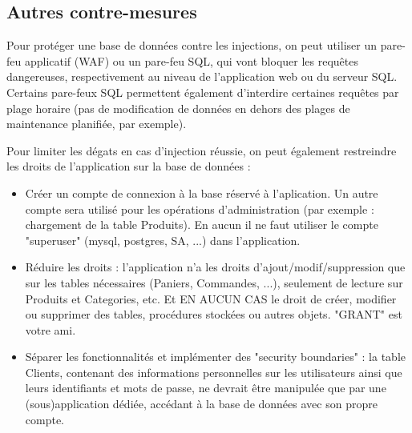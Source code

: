 \subsection{Autres contre-mesures}\label{vulnerabilites:web:sqli:countermeasures:others}

Pour protéger une base de données contre les injections, on peut utiliser un pare-feu applicatif (WAF) ou un pare-feu SQL, qui vont bloquer les requêtes dangereuses, respectivement au niveau de l'application web ou du serveur SQL. Certains pare-feux SQL permettent également d'interdire certaines requêtes par plage horaire (pas de modification de données en dehors des plages de maintenance planifiée, par exemple).

\begin{tabbing}
\end{tabbing}
Pour limiter les dégats en cas d'injection réussie, on peut également restreindre les droits de l'application sur la base de données :
\begin{tabbing}
\end{tabbing}
\begin{itemize}
\item Créer un compte de connexion à la base réservé à l'aplication. Un autre compte sera utilisé pour les opérations d'administration (par exemple : chargement de la table Produits). En aucun il ne faut utiliser le compte "superuser" (mysql, postgres, SA, ...) dans l'application.
\item Réduire les droits : l'application n'a les droits d'ajout/modif/suppression que sur les tables nécessaires (Paniers, Commandes, ...), seulement de lecture sur Produits et Categories, etc. Et EN AUCUN CAS le droit de créer, modifier ou supprimer des tables, procédures stockées ou autres objets. "GRANT" est votre ami.
\item Séparer les fonctionnalités et implémenter des "security boundaries" : la table Clients, contenant des informations personnelles sur les utilisateurs ainsi que leurs identifiants et mots de passe, ne devrait être manipulée que par une (sous)application dédiée, accédant à la base de données avec son propre compte.
\end{itemize}

\endinput

